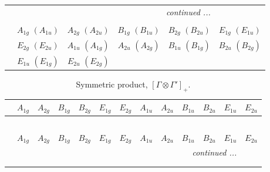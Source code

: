 \documentclass[fleqn,10pt,landscape]{article}
\begin{document}
\begin{itemize}
\begin{center}
\begin{longtable}{cccccc}
 \hline \hline
\multicolumn{5}{r}{\footnotesize\it continued ...} \\ \endfoot

 \hline \hline
\multicolumn{5}{r}{} \\ \endlastfoot

 & $ A_{1g}\,\,(A_{1u}) $ & $ A_{2g}\,\,(A_{2u}) $ & $ B_{1g}\,\,(B_{1u}) $ & $ B_{2g}\,\,(B_{2u}) $ & $ E_{1g}\,\,(E_{1u}) $ \\
& $ E_{2g}\,\,(E_{2u}) $ & $ A_{1u}\,\,(A_{1g}) $ & $ A_{2u}\,\,(A_{2g}) $ & $ B_{1u}\,\,(B_{1g}) $ & $ B_{2u}\,\,(B_{2g}) $ \\
& $ E_{1u}\,\,(E_{1g}) $ & $ E_{2u}\,\,(E_{2g}) $ & $  $ & $  $ & $  $ \\
\end{longtable}
\end{center}
\begin{center}
\renewcommand{\arraystretch}{1.0}
\begin{longtable}{c|cccccccccccc}
\caption{Symmetric product, $[\Gamma\otimes\Gamma']_+.$}
 \\
 \hline \hline
 & $ A_{1g} $ & $ A_{2g} $ & $ B_{1g} $ & $ B_{2g} $ & $ E_{1g} $ & $ E_{2g} $ & $ A_{1u} $ & $ A_{2u} $ & $ B_{1u} $ & $ B_{2u} $ & $ E_{1u} $ & $ E_{2u} $ \\ \hline \endfirsthead

\multicolumn{12}{l}{\tablename\ \thetable{}} \\
 \hline \hline
 & $ A_{1g} $ & $ A_{2g} $ & $ B_{1g} $ & $ B_{2g} $ & $ E_{1g} $ & $ E_{2g} $ & $ A_{1u} $ & $ A_{2u} $ & $ B_{1u} $ & $ B_{2u} $ & $ E_{1u} $ & $ E_{2u} $ \\ \hline \endhead

 \hline \hline
\multicolumn{12}{r}{\footnotesize\it continued ...} \\ \endfoot

 \hline \hline
\multicolumn{12}{r}{} \\ \endlastfoot


\end{longtable}
\end{center}
\end{itemize}
\end{document}
